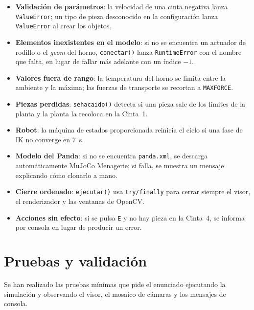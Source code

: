 \documentclass[12pt,a4paper]{article}
\renewcommand{\_}{\guionbajo\allowbreak}
\begin{document}
\begin{itemize}
    \item \textbf{Validación de parámetros}: la velocidad de una cinta negativa lanza
          \texttt{ValueError}; un tipo de pieza desconocido en la configuración lanza
          \texttt{ValueError} al crear los objetos.
    \item \textbf{Elementos inexistentes en el modelo}: si no se encuentra un actuador de
          rodillo o el \textit{geom} del horno, \texttt{conectar()} lanza
          \texttt{RuntimeError} con el nombre que falta, en lugar de fallar más adelante
          con un índice $-1$.
    \item \textbf{Valores fuera de rango}: la temperatura del horno se limita entre la
          ambiente y la máxima; las fuerzas de transporte se recortan a
          \texttt{MAX\_FORCE}.
    \item \textbf{Piezas perdidas}: \texttt{se\_ha\_caido()} detecta si una pieza sale de
          los límites de la planta y la planta la recoloca en la Cinta~1.
    \item \textbf{Robot}: la máquina de estados proporcionada reinicia el ciclo si una
          fase de IK no converge en 7~s.
    \item \textbf{Modelo del Panda}: si no se encuentra \texttt{panda.xml}, se descarga
          automáticamente MuJoCo Menagerie; si falla, se muestra un mensaje explicando
          cómo clonarlo a mano.
    \item \textbf{Cierre ordenado}: \texttt{ejecutar()} usa \texttt{try/finally} para
          cerrar siempre el visor, el renderizador y las ventanas de OpenCV.
    \item \textbf{Acciones sin efecto}: si se pulsa \texttt{E} y no hay pieza en la
          Cinta~4, se informa por consola en lugar de producir un error.
\end{itemize}

\clearpage
\section{Pruebas y validación}

Se han realizado las pruebas mínimas que pide el enunciado ejecutando la simulación y
observando el visor, el mosaico de cámaras y los mensajes de consola.
\end{document}
